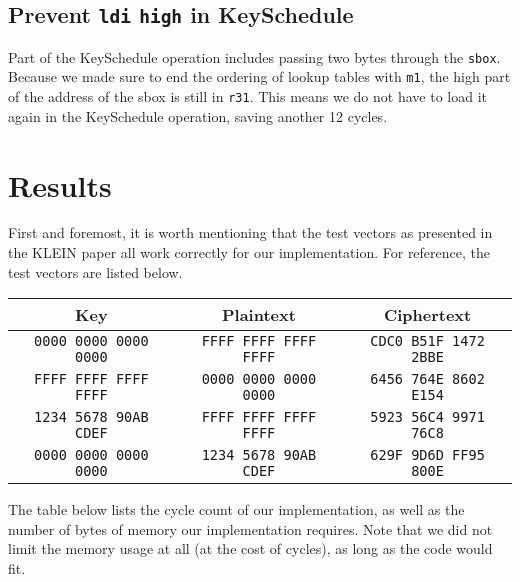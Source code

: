 \documentclass[a4paper]{article}
\begin{document}
\subsection*{Prevent \texttt{ldi} \texttt{high} in KeySchedule}

Part of the KeySchedule operation includes passing two bytes through the \texttt{sbox}. Because we made sure to end the ordering of lookup tables with \texttt{m1}, the high part of the address of the sbox is still in \texttt{r31}. This means we do not have to load it again in the KeySchedule operation, saving another 12 cycles.
\newpage
\section{Results}

First and foremost, it is worth mentioning that the test vectors as presented in the KLEIN paper all work correctly for our implementation. For reference, the test vectors are listed below.

\vspace{0.5em}
\begin{center}
	\begin{tabular}{c | c | c}
		\hline
		Key & Plaintext & Ciphertext \\
		\hline
	{\tt \small 0000 0000 0000 0000} & {\tt \small FFFF FFFF FFFF FFFF} & {\tt \small CDC0 B51F 1472 2BBE} \\
	{\tt \small FFFF FFFF FFFF FFFF} & {\tt \small 0000 0000 0000 0000} & {\tt \small 6456 764E 8602 E154} \\
	{\tt \small 1234 5678 90AB CDEF} & {\tt \small FFFF FFFF FFFF FFFF} & {\tt \small 5923 56C4 9971 76C8} \\
	{\tt \small 0000 0000 0000 0000} & {\tt \small 1234 5678 90AB CDEF} & {\tt \small 629F 9D6D FF95 800E} \\
		\hline
	\end{tabular}
\end{center}
\vspace{0.5em}

The table below lists the cycle count of our implementation, as well as the number of bytes of memory our implementation requires. Note that we did not limit the memory usage at all (at the cost of cycles), as long as the code would fit.
\end{document}
